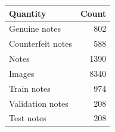 \begin{tabular}{lr}
\hline
Quantity & Count \\
\hline
Genuine notes & 802 \\
Counterfeit notes & 588 \\
Notes & 1390 \\
Images & 8340 \\
Train notes & 974 \\
Validation notes & 208 \\
Test notes & 208 \\
\hline
\end{tabular}
